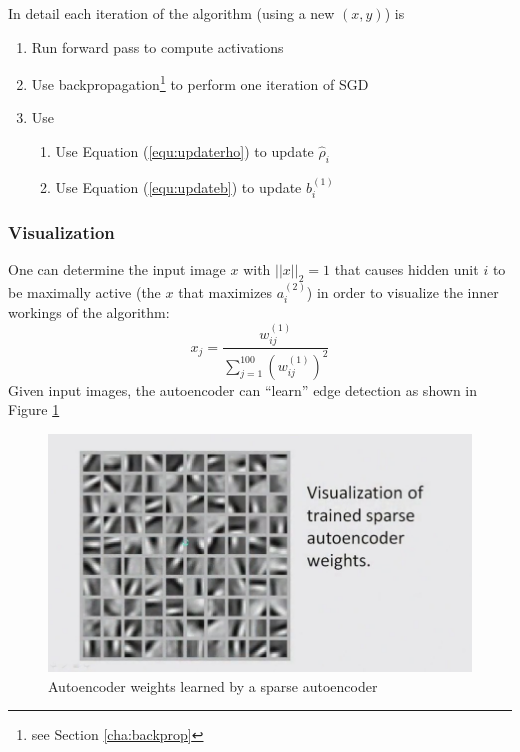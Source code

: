 \documentclass[a4paper,twoside,10pt]{article}
\begin{document}
In detail each iteration of the algorithm (using a new $(x,y)$) is
\begin{enumerate}
  \item Run forward pass to compute activations
  \item Use backpropagation\footnote{see Section \ref{cha:backprop}} to perform one iteration of \acf{SGD}
  \item Use
    \begin{enumerate}
      \item Use Equation (\ref{equ:updaterho}) to update $\widehat{\rho}_i$
      \item Use Equation (\ref{equ:updateb}) to update $b^{(1)}_i$
    \end{enumerate}
\end{enumerate}

\subsubsection{Visualization}
One can determine the input image $x$ with $||x||_2=1$ that causes hidden unit $i$ to be maximally active (the $x$ that maximizes $a^{(2)}_i$) in order to visualize the inner workings of the algorithm:
\begin{equation*}
  x_j=\frac{w^{(1)}_{ij}}{\displaystyle\sum_{j=1}^{100}(w^{(1)}_{ij})^2}
\end{equation*}
Given input images, the autoencoder can ``learn'' edge detection as shown in Figure \ref{fig:autoimage}
\begin{figure}[htbp]
  \begin{center}
    \includegraphics[width=.6\textwidth]{autoimage}
    \caption{Autoencoder weights learned by a sparse autoencoder\citep{andrewngsparse2}\label{fig:autoimage}}
  \end{center}
\end{figure}
\end{document}

